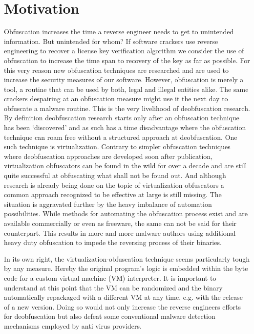 \documentclass[10pt,twoside,a4paper,bibliography=totoc]{scrbook}
\begin{document}
\section{Motivation}
\label{sec1:motiv}
Obfuscation increases the time a reverse engineer needs to get to unintended information. But unintended for whom? 
If software crackers use reverse engineering to recover a license key verification algorithm we consider the use of obfuscation to increase the time span to recovery of the key as far as possible.
For this very reason new obfuscation techniques are researched and are used to increase the security measures of our software.
However, obfuscation is merely a tool, a routine that can be used by both, legal and illegal entities alike. 
The same crackers despairing at an obfuscation measure might use it the next day to obfuscate a malware routine.
This is the very livelihood of deobfuscation research. By definition deobfuscation research starts only after an obfuscation technique has been `discovered' and as such has a time disadvantage where the obfuscation technique can roam free without a structured approach at deobfuscation.
One such technique is virtualization.
Contrary to simpler obfuscation techniques where deobfuscation approaches are developed soon after publication, virtualization obfuscators can be found in the wild for over a decade and are still quite successful at obfuscating what shall not be found out.
And although research is already being done on the topic of virtualization obfuscators \cite{Rolles:2009:UVO:1855876.1855877, Coogan:2011:DVS:2046707.2046739, DBLP:conf/sp/YadegariJWD15} a common approach recognized to be effective at large is still missing. The situation is aggravated further by the heavy imbalance of automation possibilities. While methods for automating the obfuscation process exist and are available commercially\cite{vm_prot, code_virt, themida} or even as freeware\cite{vm_prot}, the same can not be said for their counterpart\cite{Rolles:2009:UVO:1855876.1855877, DBLP:conf/sp/YadegariJWD15}. 
This results in more and more malware authors using additional heavy duty obfuscation to impede the reversing process of their binaries. 

In its own right, the virtualization-obfuscation technique seems particularly tough by any measure. Hereby the original program's logic is embedded within the byte code for a custom virtual machine (VM) interpreter\cite{Coogan:2011:DVS:2046707.2046739}. It is important to understand at this point that the VM can be randomized and the binary automatically repackaged with a different VM at any time, e.g. with the release of a new version\cite{DBLP:conf/sp/SharifLGL09}. Doing so would not only increase the reverse engineers efforts for deobfuscation but also defeat some conventional malware detection mechanisms employed by anti virus providers. 
\end{document}
